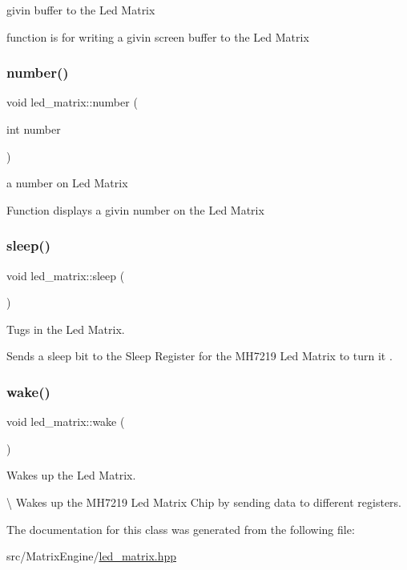 givin buffer to the Led Matrix 

function is for writing a givin screen buffer to the Led Matrix \mbox{\label{classled__matrix_a97602fdecff69971987941e12bc52a0f}} 
\subsubsection{\texorpdfstring{number()}{number()}}
{\footnotesize\ttfamily void led\+\_\+matrix\+::number (\begin{DoxyParamCaption}\item[{int}]{number }\end{DoxyParamCaption})\hspace{0.3cm}{\ttfamily [inline]}}



a number on Led Matrix 

Function displays a givin number on the Led Matrix \mbox{\label{classled__matrix_ac926b398f60702bf06e1c6582c04ed6e}} 
\subsubsection{\texorpdfstring{sleep()}{sleep()}}
{\footnotesize\ttfamily void led\+\_\+matrix\+::sleep (\begin{DoxyParamCaption}{ }\end{DoxyParamCaption})\hspace{0.3cm}{\ttfamily [inline]}}



Tugs in the Led Matrix. 

Sends a sleep bit to the Sleep Register for the M\+H7219 Led Matrix to turn it . \mbox{\label{classled__matrix_aaaf3d4913c14f5c4f3fda0bab4d2c2d7}} 
\subsubsection{\texorpdfstring{wake()}{wake()}}
{\footnotesize\ttfamily void led\+\_\+matrix\+::wake (\begin{DoxyParamCaption}{ }\end{DoxyParamCaption})\hspace{0.3cm}{\ttfamily [inline]}}



Wakes up the Led Matrix. 

\textbackslash{} Wakes up the M\+H7219 Led Matrix Chip by sending data to different registers. 

The documentation for this class was generated from the following file\+:\begin{DoxyCompactItemize}
\item 
src/\+Matrix\+Engine/\hyperlink{led__matrix_8hpp}{led\+\_\+matrix.\+hpp}\end{DoxyCompactItemize}
